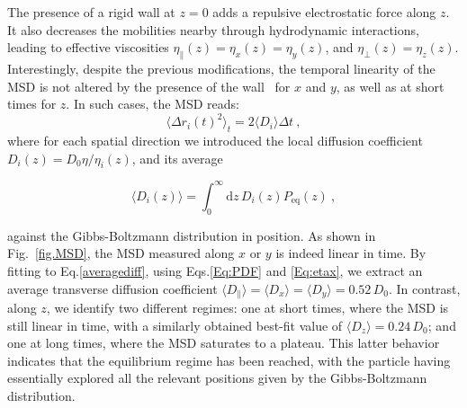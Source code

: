 The presence of a rigid wall at $z=0$ adds a repulsive electrostatic force along $z$. It also decreases the mobilities nearby through hydrodynamic interactions, leading to effective viscosities $\eta_\parallel(z)=\eta_x(z)=\eta_y(z)$, and $\eta_\bot(z) = \eta_z(z)$. Interestingly, despite the previous modifications, the temporal linearity of the MSD is not altered by the presence of the wall~\cite{chubynsky_diffusing_2014,prieve_measurement_1999} for $x$ and $y$, as well as at short times for $z$. In such cases, the MSD reads:
\begin{equation}
	\langle\Delta r_i(t)^2 \rangle_t = 2 \langle D_i \rangle \Delta t\ ,
	\label{averagediff}
\end{equation}
where for each spatial direction we introduced the local diffusion coefficient $D_i(z)=D_0\eta /\eta _i(z)$, and its average 

\begin{equation}
	\langle D_i(z) \rangle = \int_0^{\infty} \textrm{d}z\, D_i(z)P_{\textrm{eq}}(z) ~,
\end{equation}  

against the Gibbs-Boltzmann distribution in position. As shown in Fig.~\ref{fig.MSD}, the MSD measured along $x$ or $y$ is indeed linear in time. By fitting to Eq.\ref{averagediff}, using Eqs.\ref{Eq:PDF} and \ref{Eq:etax}, we extract an average transverse diffusion coefficient $\langle D_\parallel \rangle= \langle D_x\rangle=\langle D_y \rangle= 0.52\, D_0$. In contrast, along $z$, we identify two different regimes: one at short times, where the \gls{MSD} is still linear in time, with a similarly obtained best-fit value of $\langle D_z \rangle= 0.24\, D_0$; and one at long times, where the MSD saturates to a plateau. This latter behavior indicates that the equilibrium regime has been reached, with the particle having essentially explored all the relevant positions given by the Gibbs-Boltzmann distribution.

